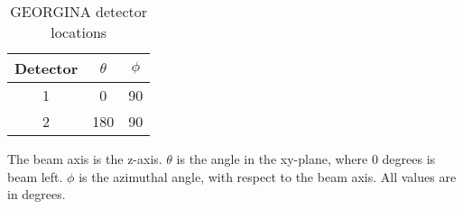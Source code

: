 \begin{table}[]
    \centering
    \caption{GEORGINA detector locations}
    \begin{tabular}{c|c|c} \toprule
         Detector & $\theta$ & $\phi$  \\
         \hline
         1 & 0 & 90 \\ 
         2 & 180 & 90\\ \bottomrule
    \end{tabular}
    \footnotesize
    \item The beam axis is the z-axis. $\theta$ is the angle in the xy-plane, where 0 degrees is beam left. $\phi$ is the azimuthal angle, with respect to the beam axis. All values are in degrees.
    \label{tab:GEORGE_Det_Loc}
\end{table}
